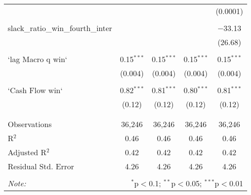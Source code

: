 \begin{table}[!htbp]
\begin{tabular}{@{\extracolsep{5pt}}lcccc}
  &  &  &  & (0.0001) \\ 
  & & & & \\ 
 slack\_ratio\_win\_fourth\_inter &  &  &  & $-$33.13 \\ 
  &  &  &  & (26.68) \\ 
  & & & & \\ 
 `lag Macro q win` & 0.15$^{***}$ & 0.15$^{***}$ & 0.15$^{***}$ & 0.15$^{***}$ \\ 
  & (0.004) & (0.004) & (0.004) & (0.004) \\ 
  & & & & \\ 
 `Cash Flow win` & 0.82$^{***}$ & 0.81$^{***}$ & 0.80$^{***}$ & 0.81$^{***}$ \\ 
  & (0.12) & (0.12) & (0.12) & (0.12) \\ 
  & & & & \\ 
\hline \\[-1.8ex] 
Observations & 36,246 & 36,246 & 36,246 & 36,246 \\ 
R$^{2}$ & 0.46 & 0.46 & 0.46 & 0.46 \\ 
Adjusted R$^{2}$ & 0.42 & 0.42 & 0.42 & 0.42 \\ 
Residual Std. Error & 4.26 & 4.26 & 4.26 & 4.26 \\ 
\hline 
\hline \\[-1.8ex] 
\textit{Note:}  & \multicolumn{4}{r}{$^{*}$p$<$0.1; $^{**}$p$<$0.05; $^{***}$p$<$0.01} \\ 
\end{tabular} 
\end{table} 
